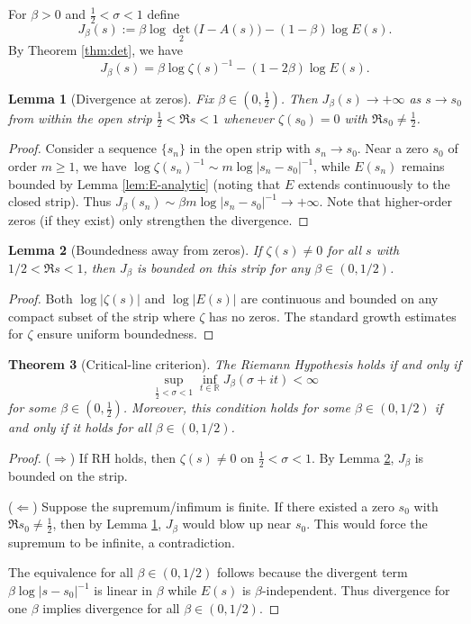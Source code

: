 \documentclass[12pt]{article}
\newtheorem{theorem}{Theorem}[section]
\newtheorem{lemma}[theorem]{Lemma}
\theoremstyle{definition}
\theoremstyle{remark}
\begin{document}
For $\beta>0$ and $\tfrac12<\sigma<1$ define
\[
  J_{\beta}(s):=\beta\log\det_{2}\bigl(I-A(s)\bigr)-(1-\beta)\log E(s).
\]
By Theorem \ref{thm:det}, we have
\[
   J_{\beta}(s)=\beta\log\zeta(s)^{-1}-(1-2\beta)\log E(s).
\]

\begin{lemma}[Divergence at zeros]\label{lem:div}
Fix $\beta\in(0,\tfrac12)$. Then $J_{\beta}(s)\to+\infty$ as $s\to s_{0}$ 
from within the open strip $\tfrac12<\Re s<1$ whenever $\zeta(s_{0})=0$ 
with $\Re s_{0}\neq\tfrac12$.
\end{lemma}

\begin{proof}
Consider a sequence $\{s_n\}$ in the open strip with $s_n \to s_0$.
Near a zero $s_{0}$ of order $m \geq 1$, we have
$\log\zeta(s_n)^{-1}\sim m\log|s_n-s_{0}|^{-1}$,
while $E(s_n)$ remains bounded by Lemma \ref{lem:E-analytic} (noting that
$E$ extends continuously to the closed strip).
Thus $J_{\beta}(s_n)\sim\beta m\log|s_n-s_{0}|^{-1}\to+\infty$.
Note that higher-order zeros (if they exist) only strengthen the divergence.
\end{proof}

\begin{lemma}[Boundedness away from zeros]\label{lem:bounded}
If $\zeta(s) \neq 0$ for all $s$ with $1/2 < \Re s < 1$, then
$J_\beta$ is bounded on this strip for any $\beta \in (0,1/2)$.
\end{lemma}

\begin{proof}
Both $\log|\zeta(s)|$ and $\log|E(s)|$ are continuous and bounded on any
compact subset of the strip where $\zeta$ has no zeros. The standard
growth estimates for $\zeta$ ensure uniform boundedness.
\end{proof}

\begin{theorem}[Critical-line criterion]\label{thm:main}
The Riemann Hypothesis holds if and only if
\[
   \sup_{\tfrac12<\sigma<1}
        \inf_{t\in\mathbb{R}}J_{\beta}(\sigma+it)<\infty
\]
for some $\beta\in(0,\tfrac12)$. Moreover, this condition holds for some
$\beta \in (0,1/2)$ if and only if it holds for all $\beta \in (0,1/2)$.
\end{theorem}

\begin{proof}
($\Rightarrow$) If RH holds, then $\zeta(s)\neq 0$ on $\tfrac12<\sigma<1$.
By Lemma \ref{lem:bounded}, $J_{\beta}$ is bounded on the strip.

($\Leftarrow$) Suppose the supremum/infimum is finite. If there existed a zero 
$s_{0}$ with $\Re s_{0}\neq\tfrac12$, then by Lemma \ref{lem:div}, 
$J_{\beta}$ would blow up near $s_{0}$. This would force the supremum
to be infinite, a contradiction.

The equivalence for all $\beta \in (0,1/2)$ follows because the divergent
term $\beta\log|s-s_0|^{-1}$ is linear in $\beta$ while $E(s)$ is 
$\beta$-independent. Thus divergence for one $\beta$ implies divergence 
for all $\beta \in (0,1/2)$.
\end{proof}
\end{document}
